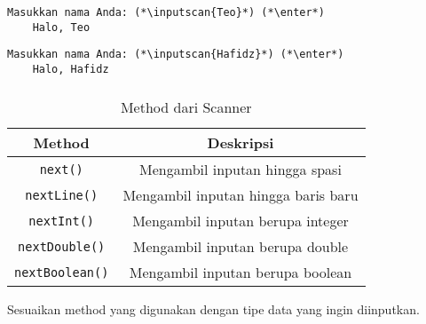 \documentclass[aspectratio=169]{beamer}
\theoremstyle{definition}
\newcommand{\enter}{\raisebox{-1.8pt}{\begin{tikzpicture}[scale=0.3]
    \draw[thin,fill=gray] (0,0) rectangle (2,1);
    \draw (0.3,0.3) -- (0.7,0.3)--(0.7,0.6);     
\end{tikzpicture}}}
\newcommand{\inputscan}[1]{\raisebox{0pt}[1pt]{\colorbox{darkgray}{#1}}}
\begin{document}
    \begin{frame}[fragile]
        \frametitle{\insertsection}
        \begin{lstlisting}[style=output,title=Output \#1]
    Masukkan nama Anda: (*\inputscan{Teo}*) (*\enter*)
    Halo, Teo
        \end{lstlisting}
        \begin{lstlisting}[style=output,title=Output \#2]
    Masukkan nama Anda: (*\inputscan{Hafidz}*) (*\enter*)
    Halo, Hafidz
        \end{lstlisting}
    \vspace*{0.5cm}
    \end{frame}

    \begin{frame}
        \frametitle{\insertsection}
        \begin{table}
            \centering
            \begin{tabular}{|c|c|}
                \hline
                \rowcolor{HIMAmuda}  
                \textbf{Method} & \textbf{Deskripsi} \\
                \hline
                \texttt{next()} & Mengambil inputan hingga spasi \\
                \hline
                \texttt{nextLine()} & Mengambil inputan hingga baris baru \\
                \hline
                \texttt{nextInt()} & Mengambil inputan berupa integer \\
                \hline
                \texttt{nextDouble()} & Mengambil inputan berupa double \\
                \hline
                \texttt{nextBoolean()} & Mengambil inputan berupa boolean \\
                \hline
            \end{tabular}
            \caption{Method dari Scanner}
        \end{table}
        \vspace*{0.5cm}
        Sesuaikan method yang digunakan dengan tipe data yang ingin diinputkan.
    \end{frame}
\end{document}
